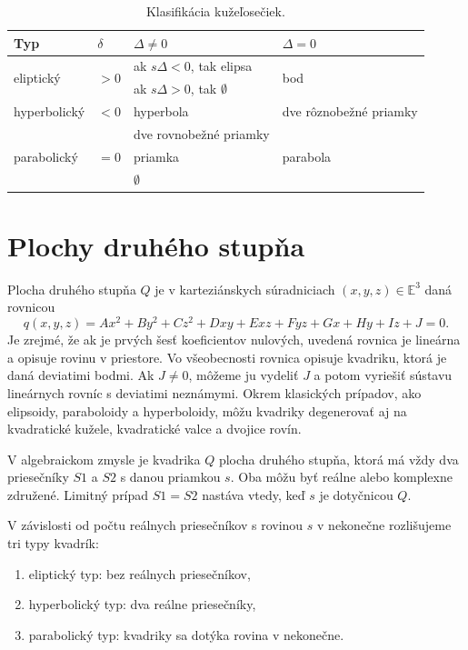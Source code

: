 \begin{table}[h]
\centering
\begin{tabular}{|l|l|l|l|}
\hline
\textbf{Typ} & $\delta$ & $\Delta \neq  0$ & $\Delta = 0 $ \\
\hline
\multirow{2}{*}{eliptický} & \multirow{2}{*}{$> 0$} & ak $s\Delta < 0$, tak elipsa & \multirow{2}{*}{bod} \\
& & ak $s\Delta > 0$, tak $\emptyset$ & \\
\hline
hyperbolický & $< 0$ & hyperbola & dve rôznobežné priamky \\
\hline
\multirow{3}{*}{parabolický} & \multirow{3}{*}{$= 0$} & dve rovnobežné priamky & \multirow{3}{*}{parabola} \\
& & priamka & \\
& & $\emptyset$ & \\
\hline
\end{tabular}
\caption{Klasifikácia kužeľosečiek.}
\label{tab:conic_sections}
\end{table}

\section{Plochy druhého stupňa}
Plocha druhého stupňa $Q$ je v karteziánskych súradniciach $(x, y, z) \in \mathbb{E}^3$ daná rovnicou
\[ q(x, y, z) = Ax^2 + By^2 + Cz^2 + Dxy + Exz + Fyz + Gx + Hy + Iz + J = 0. \]
Je zrejmé, že ak je prvých šesť koeficientov nulových, uvedená rovnica je lineárna a opisuje rovinu v priestore. Vo všeobecnosti rovnica opisuje kvadriku, ktorá je daná deviatimi bodmi. Ak $J \neq 0$, môžeme ju vydeliť $J$ a potom vyriešiť sústavu lineárnych rovníc s deviatimi neznámymi. Okrem klasických prípadov, ako elipsoidy, paraboloidy a hyperboloidy, môžu kvadriky degenerovať aj na kvadratické kužele, kvadratické valce a dvojice rovín.

V algebraickom zmysle je kvadrika $Q$ plocha druhého stupňa, ktorá má vždy dva priesečníky $S1$ a $S2$ s danou priamkou $s$. Oba môžu byť reálne alebo komplexne združené. Limitný prípad $S1 = S2$ nastáva vtedy, keď $s$ je dotyčnicou $Q$.

V závislosti od počtu reálnych priesečníkov s rovinou $s$ v nekonečne rozlišujeme tri typy kvadrík:
\begin{enumerate}
\item eliptický typ: bez reálnych priesečníkov,
\item hyperbolický typ: dva reálne priesečníky,
\item parabolický typ: kvadriky sa dotýka rovina v nekonečne.
\end{enumerate}

